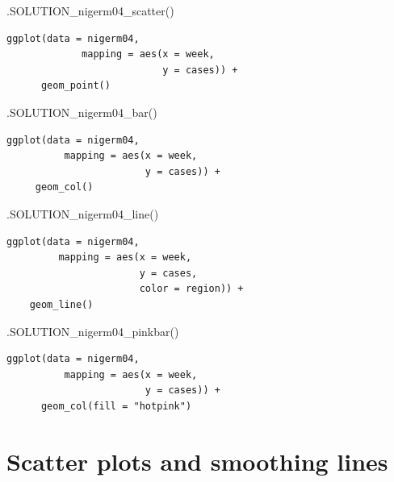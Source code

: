\documentclass[
  letterpaper,
  DIV=11,
  numbers=noendperiod]{scrreprt}
\newenvironment{Shaded}{\begin{snugshade}}{\end{snugshade}}
\newcommand{\FunctionTok}[1]{\textcolor[rgb]{0.28,0.35,0.67}{#1}}
\newcommand{\NormalTok}[1]{\textcolor[rgb]{0.00,0.23,0.31}{#1}}
\begin{document}
\begin{Shaded}
\begin{Highlighting}[]
\FunctionTok{.SOLUTION\_nigerm04\_scatter}\NormalTok{()}
\end{Highlighting}
\end{Shaded}

\begin{verbatim}
ggplot(data = nigerm04,
             mapping = aes(x = week, 
                           y = cases)) +
      geom_point()
\end{verbatim}

\begin{Shaded}
\begin{Highlighting}[]
\FunctionTok{.SOLUTION\_nigerm04\_bar}\NormalTok{()}
\end{Highlighting}
\end{Shaded}

\begin{verbatim}
ggplot(data = nigerm04, 
          mapping = aes(x = week, 
                        y = cases)) + 
     geom_col()
\end{verbatim}

\begin{Shaded}
\begin{Highlighting}[]
\FunctionTok{.SOLUTION\_nigerm04\_line}\NormalTok{()}
\end{Highlighting}
\end{Shaded}

\begin{verbatim}
ggplot(data = nigerm04,
         mapping = aes(x = week,
                       y = cases,
                       color = region)) + 
    geom_line()
\end{verbatim}

\begin{Shaded}
\begin{Highlighting}[]
\FunctionTok{.SOLUTION\_nigerm04\_pinkbar}\NormalTok{()}
\end{Highlighting}
\end{Shaded}

\begin{verbatim}
ggplot(data = nigerm04, 
          mapping = aes(x = week, 
                        y = cases)) +
      geom_col(fill = "hotpink")
\end{verbatim}

\chapter{Scatter plots and smoothing
lines}\label{scatter-plots-and-smoothing-lines}
\end{document}
